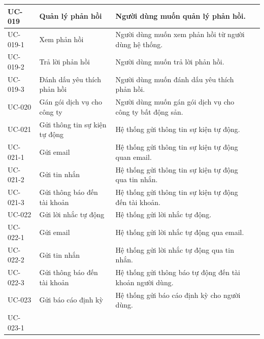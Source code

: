 \documentclass[12pt,a4paper]{article}
\begin{document}
\begin{center}
\begin{longtable}{|p{2.5cm}|p{4.5cm}|p{7.5cm}|c|}
            UC-019
            & Quản lý phản hồi
            & Người dùng muốn quản lý phản hồi.
            \\ \hline
            UC-019-1
            & Xem phản hồi
            & Người dùng muốn xem phản hồi từ người dùng hệ thống.
            \\ \hline
            UC-019-2
            & Trả lời phản hồi
            & Người dùng muốn trả lời phản hồi.
            \\ \hline
            UC-019-3
            & Đánh dấu yêu thích phản hồi
            & Người dùng muốn đánh dấu yêu thích phản hồi.
            \\ \hline
            UC-020
            & Gán gói dịch vụ cho công ty
            & Người dùng muốn gán gói dịch vụ cho công ty bất động sản.
            \\ \hline
            UC-021
            & Gửi thông tin sự kiện tự động
            & Hệ thống gửi thông tin sự kiện tự động.
            \\ \hline
            UC-021-1
            & Gửi email
            & Hệ thống gửi thông tin sự kiện tự động quan email.
            \\ \hline
            UC-021-2
            & Gửi tin nhắn
            & Hệ thống gửi thông tin sự kiện tự động qua tin nhắn.
            \\ \hline
            UC-021-3
            & Gửi thông báo đến tài khoản
            & Hệ thống gửi thông tin sự kiện tự động đến tài khoản.
            \\ \hline
            UC-022
            & Gửi lời nhắc tự động
            & Hệ thống gửi lời nhắc tự động.
            \\ \hline
            UC-022-1
            & Gửi email
            & Hệ thống gửi lời nhắc tự động qua email.
            \\ \hline
            UC-022-2
            & Gửi tin nhắn
            & Hệ thống gửi lời nhắc tự động qua tin nhắn.
            \\ \hline
            UC-022-3
            & Gửi thông báo đến tài khoản
            & Hệ thống gửi thông báo tự động đến tài khoản người dùng.
            \\ \hline
            UC-023
            & Gửi báo cáo định kỳ
            & Hệ thống gửi báo cáo định kỳ cho người dùng.
            \\ \hline
            UC-023-1

\end{longtable}
\end{center}
\end{document}
